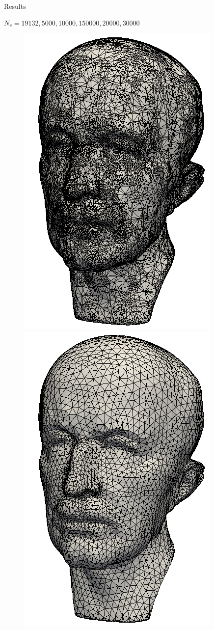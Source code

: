 \documentclass{beamer}
\begin{document}
\begin{frame}[plain]{Results}

  $N_v = 19132, 5000, 10000, 150000, 20000, 30000$

   \begin{figure}
    \begin{minipage}{.31\textwidth}
      \centering
      \includegraphics[width=0.7\linewidth]{../image/mpr_0.png}
    \end{minipage} 
    \begin{minipage}{0.31\textwidth}
      \centering
      \includegraphics[width=0.7\linewidth]{../image/mpr_a.png}

\end{minipage}
\end{figure}
\end{frame}
\end{document}
